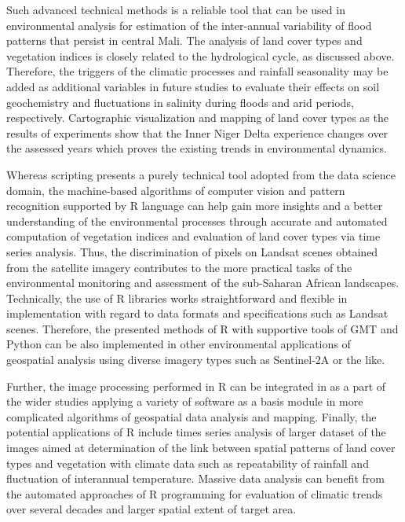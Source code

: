 \documentclass[remotesensing,article,submit,pdftex,moreauthors]{Definitions/mdpi}
\begin{document}
Such advanced technical methods is a reliable tool that can be used in environmental analysis for estimation of the inter-annual variability of flood patterns that persist in central Mali. The analysis of land cover types and vegetation indices is closely related to the hydrological cycle, as discussed above. Therefore, the triggers of the climatic processes and rainfall seasonality may be added as additional variables in future studies to evaluate their effects on soil geochemistry and fluctuations in salinity during floods and arid periods, respectively. Cartographic visualization and mapping of land cover types as the results of experiments show that the Inner Niger Delta experience changes over the assessed years which proves the existing trends in environmental dynamics.  

Whereas scripting presents a purely technical tool adopted from the data science domain, the machine-based algorithms of computer vision and pattern recognition supported by R language can help gain more insights and a better understanding of the environmental processes through accurate and automated computation of vegetation indices and evaluation of land cover types via time series analysis. Thus, the discrimination of pixels on Landsat scenes obtained from the satellite imagery contributes to the more practical tasks of the environmental monitoring and assessment of the sub-Saharan African landscapes. Technically, the use of R libraries works straightforward and flexible in implementation with regard to data formats and specifications such as Landsat scenes. Therefore, the presented methods of R with supportive tools of GMT and Python can be also implemented in other environmental applications of geospatial analysis using diverse imagery types such as Sentinel-2A or the like. 

Further, the image processing performed in R can be integrated in as a part of the wider studies applying a variety of software as a basis module in more complicated algorithms of geospatial data analysis and mapping. Finally, the potential applications of R include times series analysis of larger dataset of the images aimed at determination of the link between spatial patterns of land cover types and vegetation with climate data such as repeatability of rainfall and fluctuation of interannual temperature. Massive data analysis can benefit from the automated approaches of R programming for evaluation of climatic trends over several decades and larger spatial extent of target area.

\end{document}
